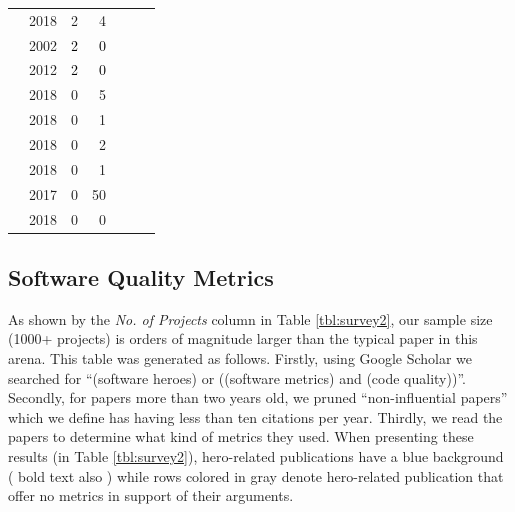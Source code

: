 \documentclass[smallextended]{svjour3}
\newcommand{\cmark}{\ding{51}}%
\newcommand{\xmark}{\ding{55}}%
\begin{document}
\begin{table}
\begin{tabular}{r|@{~}c|@{~}c|@{~}r|@{~}c|@{~}c|@{~}c}
        \cite{Jayanthi2018} & 2018 &	2 &	4   & \cmark & \cmark & \xmark \\
      \rowcolor{gray!20}  {\cite{hislop2002integrating}} &{2002} &	\textcolor{black}{2} &	\textcolor{black}{0} & \xmark & \xmark & \xmark \\
      \rowcolor{blue!10}  {\cite{morcovcomplex}} &{2012} &	 \textcolor{black}{2} &	\textcolor{black}{0} & \xmark & \xmark & \xmark \\
        \cite{10.1007/978-981-13-1927-3_48} & 2018 &	0 &	5   & \cmark & \xmark & \xmark \\
        \cite{prasad2018statistical} & 2018 &	0 &	 1  & \cmark & \cmark & \xmark \\
        \cite{dahab2018enhancing} & 2018 &	0 &	2   & \xmark & \cmark & \xmark \\
        \cite{8595100} & 2018 &	0 &	1   & \cmark & \xmark & \xmark \\
        \cite{vijay2017software} & 2017 & 0	 &	50   & \xmark & \cmark & \xmark \\
        \cite{10.1007/978-3-319-92270-6_42} & 2018 & 0	&	0  & \xmark & \cmark & \cmark \\
        
         
        
\end{tabular}
\vspace{-0.3cm}
\end{table}

 

 
\subsection{Software Quality   Metrics}\label{tion:metrics}

As shown by the {\em No. of Projects} column in Table \ref{tbl:survey2}, our sample size  
  (1000+ projects) is orders of magnitude larger than the typical paper in this arena.
This table was   generated as follows. Firstly, using Google Scholar we searched for ``(software heroes) or ((software metrics) and (code quality))''. Secondly, for papers more than two years old, we pruned ``non-influential
papers'' which we define has having less than ten citations per year. Thirdly, we read the papers to determine what kind of metrics they used.
When presenting these results (in Table \ref{tbl:survey2}),
hero-related publications have a blue background ( bold text also ) while rows colored in gray denote hero-related publication that offer no metrics in support of their arguments. 
\end{document}
